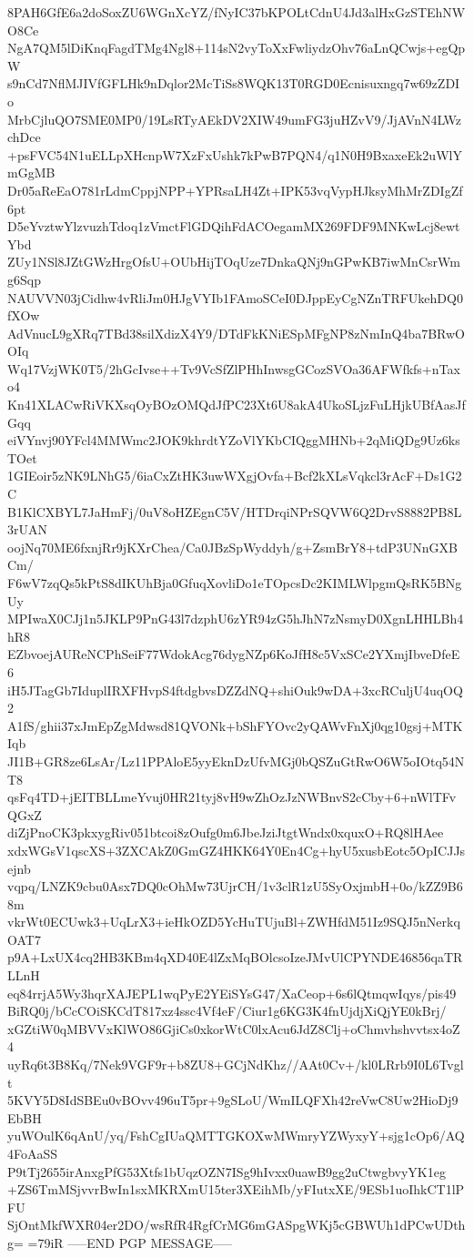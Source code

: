 8PAH6GfE6a2doSoxZU6WGnXcYZ/fNyIC37bKPOLtCdnU4Jd3alHxGzSTEhNWO8Ce
NgA7QM5lDiKnqFagdTMg4Ngl8+114sN2vyToXxFwliydzOhv76aLnQCwjs+egQpW
s9nCd7NflMJIVfGFLHk9nDqlor2McTiSs8WQK13T0RGD0Ecnisuxngq7w69zZDIo
MrbCjluQO7SME0MP0/19LsRTyAEkDV2XIW49umFG3juHZvV9/JjAVnN4LWzchDce
+psFVC54N1uELLpXHcnpW7XzFxUshk7kPwB7PQN4/q1N0H9BxaxeEk2uWlYmGgMB
Dr05aReEaO781rLdmCppjNPP+YPRsaLH4Zt+IPK53vqVypHJksyMhMrZDIgZf6pt
D5eYvztwYlzvuzhTdoq1zVmctFlGDQihFdACOegamMX269FDF9MNKwLcj8ewtYbd
ZUy1NSl8JZtGWzHrgOfsU+OUbHijTOqUze7DnkaQNj9nGPwKB7iwMnCsrWmg6Sqp
NAUVVN03jCidhw4vRliJm0HJgVYIb1FAmoSCeI0DJppEyCgNZnTRFUkehDQ0fXOw
AdVnucL9gXRq7TBd38silXdizX4Y9/DTdFkKNiESpMFgNP8zNmInQ4ba7BRwOOIq
Wq17VzjWK0T5/2hGcIvse++Tv9VcSfZlPHhInwsgGCozSVOa36AFWfkfs+nTaxo4
Kn41XLACwRiVKXsqOyBOzOMQdJfPC23Xt6U8akA4UkoSLjzFuLHjkUBfAasJfGqq
eiVYnvj90YFcl4MMWmc2JOK9khrdtYZoVlYKbCIQggMHNb+2qMiQDg9Uz6ksTOet
1GIEoir5zNK9LNhG5/6iaCxZtHK3uwWXgjOvfa+Bcf2kXLsVqkcl3rAcF+Ds1G2C
B1KlCXBYL7JaHmFj/0uV8oHZEgnC5V/HTDrqiNPrSQVW6Q2DrvS8882PB8L3rUAN
oojNq70ME6fxnjRr9jKXrChea/Ca0JBzSpWyddyh/g+ZsmBrY8+tdP3UNnGXBCm/
F6wV7zqQs5kPtS8dIKUhBja0GfuqXovliDo1eTOpcsDc2KIMLWlpgmQsRK5BNgUy
MPIwaX0CJj1n5JKLP9PnG43l7dzphU6zYR94zG5hJhN7zNsmyD0XgnLHHLBh4hR8
EZbvoejAUReNCPhSeiF77WdokAcg76dygNZp6KoJfH8c5VxSCe2YXmjIbveDfeE6
iH5JTagGb7IduplIRXFHvpS4ftdgbvsDZZdNQ+shiOuk9wDA+3xcRCuljU4uqOQ2
A1fS/ghii37xJmEpZgMdwsd81QVONk+bShFYOvc2yQAWvFnXj0qg10gsj+MTKIqb
JI1B+GR8ze6LsAr/Lz11PPAloE5yyEknDzUfvMGj0bQSZuGtRwO6W5oIOtq54NT8
qsFq4TD+jEITBLLmeYvuj0HR21tyj8vH9wZhOzJzNWBnvS2cCby+6+nWlTFvQGxZ
diZjPnoCK3pkxygRiv051btcoi8zOufg0m6JbeJziJtgtWndx0xquxO+RQ8lHAee
xdxWGsV1qscXS+3ZXCAkZ0GmGZ4HKK64Y0En4Cg+hyU5xusbEotc5OpICJJsejnb
vqpq/LNZK9cbu0Asx7DQ0cOhMw73UjrCH/1v3clR1zU5SyOxjmbH+0o/kZZ9B68m
vkrWt0ECUwk3+UqLrX3+ieHkOZD5YcHuTUjuBl+ZWHfdM51Iz9SQJ5nNerkqOAT7
p9A+LxUX4cq2HB3KBm4qXD40E4lZxMqBOlcsoIzeJMvUlCPYNDE46856qaTRLLnH
eq84rrjA5Wy3hqrXAJEPL1wqPyE2YEiSYsG47/XaCeop+6s6lQtmqwIqys/pis49
BiRQ0j/bCcCOiSKCdT817xz4ssc4Vf4eF/Ciur1g6KG3K4fnUjdjXiQjYE0kBrj/
xGZtiW0qMBVVxKlWO86GjiCs0xkorWtC0lxAcu6JdZ8Clj+oChmvhshvvtsx4oZ4
uyRq6t3B8Kq/7Nek9VGF9r+b8ZU8+GCjNdKhz//AAt0Cv+/kl0LRrb9I0L6Tvglt
5KVY5D8IdSBEu0vBOvv496uT5pr+9gSLoU/WmILQFXh42reVwC8Uw2HioDj9EbBH
yuWOulK6qAnU/yq/FshCgIUaQMTTGKOXwMWmryYZWyxyY+sjg1cOp6/AQ4FoAaSS
P9tTj2655irAnxgPfG53Xtfs1bUqzOZN7ISg9hIvxx0uawB9gg2uCtwgbvyYK1eg
+ZS6TmMSjvvrBwIn1sxMKRXmU15ter3XEihMb/yFIutxXE/9ESb1uoIhkCT1lPFU
SjOntMkfWXR04er2DO/wsRfR4RgfCrMG6mGASpgWKj5cGBWUh1dPCwUDthg=
=79iR
-----END PGP MESSAGE-----
